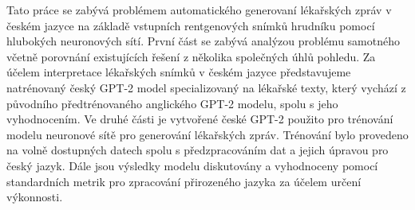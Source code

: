 \documentclass[12pt]{report}
\begin{document}

Tato práce se zabývá problémem automatického generovaní lékařských zpráv v českém jazyce na základě vstupních rentgenových snímků hrudníku pomocí hlubokých neuronových sítí. První část se zabývá analýzou problému samotného včetně porovnání existujících řešení z několika společných úhlů pohledu. Za účelem interpretace lékařských snímků v českém jazyce představujeme natrénovaný český GPT-2 model specializovaný na lékařské texty, který vychází z původního předtrénovaného anglického GPT-2 modelu, spolu s jeho vyhodnocením. Ve druhé části je vytvořené české GPT-2 použito pro trénování modelu neuronové sítě pro generování lékařských zpráv. Trénování bylo provedeno na volně dostupných datech spolu s předzpracováním dat a jejich úpravou pro český jazyk. Dále jsou výsledky modelu diskutovány a vyhodnoceny pomocí standardních metrik pro zpracování přirozeného jazyka za účelem určení výkonnosti.
\end{document}
